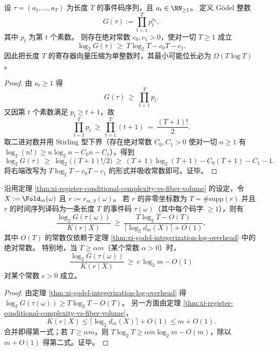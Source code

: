 \begin{theorem}\label{thm:xi-godel-integerization-log-overhead}
设 \(\tau=(a_1,\dots,a_T)\) 为长度 \(T\) 的事件码序列，且 \(a_t\in\NN_{\ge1}\)。
定义 Gödel 整数
\[
G(\tau):=\prod_{t=1}^{T}p_t^{a_t},
\]
其中 \(p_t\) 为第 \(t\) 个素数。
则存在绝对常数 \(c_0,c_1>0\)，使对一切 \(T\ge 1\) 成立
\[
\log_2 G(\tau)\ \ge\ T\log_2 T-c_0T-c_1.
\]
因此把长度 \(T\) 的寄存器向量压缩为单整数时，其最小可能位长必为 \(\Omega(T\log T)\)。
\end{theorem}
\begin{proof}
由 \(a_t\ge 1\) 得
\[
G(\tau)\ \ge\ \prod_{t=1}^{T}p_t.
\]
又因第 \(t\) 个素数满足 \(p_t\ge t+1\)，故
\[
\prod_{t=1}^{T}p_t\ \ge\ \prod_{t=1}^{T}(t+1)\ =\ \frac{(T+1)!}{2}.
\]
取二进对数并用 Stirling 型下界（存在绝对常数 \(C_0,C_1>0\) 使对一切 \(n\ge 1\) 有
\(\log_2(n!)\ge n\log_2 n-C_0n-C_1\)），得到
\[
\log_2 G(\tau)\ \ge\ \log_2\bigl((T+1)!/2\bigr)
\ \ge\ (T+1)\log_2(T+1)-C_0(T+1)-C_1-1.
\]
将右端改写为 \(T\log_2T-c_0T-c_1\) 的形式并吸收常数即可。证毕。
\end{proof}

\begin{corollary}\label{cor:xi-godel-integerization-vs-conditional-complexity-gap}
沿用定理 \ref{thm:xi-register-conditional-complexity-vs-fiber-volume} 的设定，令 \(X:=\Fold_m(\omega)\) 且 \(r:=r_{m,S}(\omega)\)。
若 \(r\) 的非零坐标数为 \(T=\#\mathrm{supp}(r)\) 并且 \(r\) 的时间序列译码为一条长度 \(T\) 的事件码 \(\tau(\omega)\)（其中每个码字 \(\ge 1\)），则有
\[
\frac{\log_2 G(\tau(\omega))}{K(r\mid X)}
\ \ge\
\frac{T\log_2 T-O(T)}{\lceil\log_2 d_m(X)\rceil+O(1)},
\]
其中 \(O(T)\) 的常数仅依赖于定理 \ref{thm:xi-godel-integerization-log-overhead} 中的绝对常数。
特别地，当 \(T\ge \alpha m\)（某个常数 \(\alpha>0\)）时，
\[
\frac{\log_2 G(\tau(\omega))}{K(r\mid X)}\ \ge\ c\,\log_2 m-O(1)
\]
对某个常数 \(c>0\) 成立。
\end{corollary}
\begin{proof}
由定理 \ref{thm:xi-godel-integerization-log-overhead} 得
\(\log_2 G(\tau(\omega))\ge T\log_2 T-O(T)\)。
另一方面由定理 \ref{thm:xi-register-conditional-complexity-vs-fiber-volume}，
\[
K(r\mid X)\le \lceil\log_2 d_m(X)\rceil+O(1)\le m+O(1).
\]
合并即得第一式；若 \(T\ge \alpha m\)，则 \(T\log_2 T\ge \alpha m\log_2 m-O(m)\)，除以 \(m+O(1)\) 得第二式。证毕。
\end{proof}

